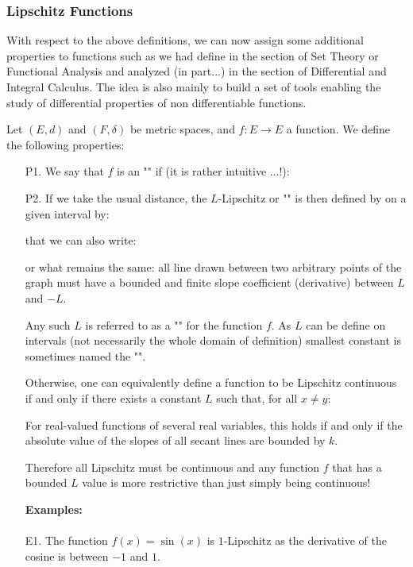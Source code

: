 	
	\subsubsection{Lipschitz Functions}
	With respect to the above definitions, we can now assign some additional properties to functions such as we had define in the section of Set Theory or Functional Analysis and analyzed (in part...) in the section of Differential and Integral Calculus. The idea is also mainly to build a set of tools enabling the study of differential properties of non differentiable functions.
	
	Let $(E, d)$ and $(F,\delta)$ be metric spaces, and $f:E \rightarrow E$ a function. We define the following properties:
	\begin{enumerate}
		\item[P1.] We say that $f$ is an "" if (it is rather intuitive ...!):
		
		
		\item[P2.] If we take the usual distance, the $L$-Lipschitz or "" is then defined by on a given interval by:
		
		that we can also write:
		
		or what remains the same: all line drawn between two arbitrary points of the graph must have a bounded and finite slope coefficient (derivative) between $L$ and $-L$.
		
		Any such $L$ is referred to as a "" for the function $f$. As $L$ can be define on intervals (not necessarily the whole domain of definition) smallest constant is sometimes named the "".
		
		Otherwise, one can equivalently define a function to be Lipschitz continuous if and only if there exists a constant $L$ such that, for all $x\neq y$:
		
		For real-valued functions of several real variables, this holds if and only if the absolute value of the slopes of all secant lines are bounded by $k$. 
		
		Therefore all Lipschitz must be continuous and any function $f$ that has a bounded $L$ value is more restrictive than just simply being continuous! 
		
		\begin{tcolorbox}[colframe=black,colback=white,sharp corners]
		\textbf{{\Large {}}Examples:}\\\\
		E1. The function $f(x)=\sin (x)$ is $1$-Lipschitz as the derivative of the cosine is between $-1$ and $1$.\\
		

\end{tcolorbox}
\end{enumerate}

